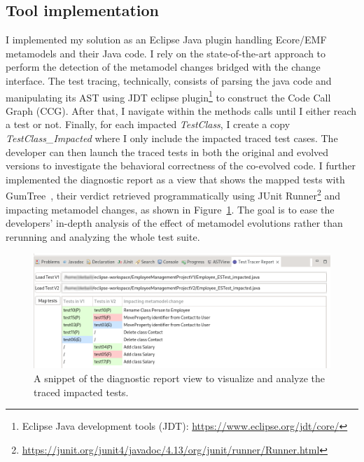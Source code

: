 \subsection{Tool implementation}

I implemented my solution as an Eclipse Java plugin handling Ecore/EMF metamodels and their Java code. %
I rely on the state-of-the-art approach \cite{khelladi2015detecting} to perform the detection of the metamodel changes bridged with the change interface. 
The test tracing, technically, consists of parsing the java code and manipulating its AST using JDT eclipse plugin\footnote{Eclipse Java development tools (JDT): \url{https://www.eclipse.org/jdt/core/}} to construct the Code Call Graph (CCG). After that, I navigate within the methods calls until I either reach a test or not. Finally, for each impacted \emph{TestClass}, I create a copy \emph{TestClass\_Impacted} where I only include the impacted traced test cases. The developer can then launch the traced tests in both the original and evolved versions to investigate the behavioral correctness of the co-evolved code. 
%
I further implemented the diagnostic report as a view that shows the mapped tests with GumTree~\cite{falleri2014fine}, their verdict retrieved programmatically using JUnit Runner\footnote{\url{https://junit.org/junit4/javadoc/4.13/org/junit/runner/Runner.html}} and impacting metamodel changes, as shown in Figure~\ref{fig:toolView}. The goal is to ease the developers' in-depth analysis of the effect of metamodel evolutions rather than rerunning and analyzing the whole test suite.

\begin{figure}[tb]
	\centering
	\includegraphics[width=1\textwidth]{./pics/chapter2pics/TestTraceReport.png}
	\caption{A snippet of the diagnostic report view to visualize and analyze the traced impacted tests.}
	\label{fig:toolView}
\end{figure}
